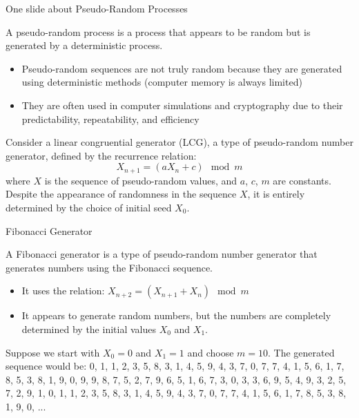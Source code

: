 \documentclass[fullscreen=true, bookmarks=true, hyperref={pdfencoding=unicode}]{beamer}
\begin{document}
\begin{frame}{One slide about Pseudo-Random Processes}

  \begin{definition}
  A pseudo-random process is a process that appears to be random 
  but is generated by a deterministic process.
  \end{definition}

  \begin{itemize}
      \pause\item Pseudo-random sequences are not truly random because 
      they are generated using deterministic methods (computer memory is always limited)
      \pause\item They are often used in computer simulations and cryptography 
      due to their predictability, repeatability, and efficiency
  \end{itemize}

  \pause
  \begin{example}
  \small
  Consider a linear congruential generator (LCG), a type of pseudo-random number generator, defined by the recurrence relation:
  \[
  X_{n+1} = (aX_n + c) \mod m
  \]
  where $X$ is the sequence of pseudo-random values, and $a$, $c$, $m$ are constants. Despite the appearance of randomness in the sequence $X$, it is entirely determined by the choice of initial seed $X_0$.
  \end{example}
\end{frame}


\begin{frame}{Fibonacci Generator}

  \pause
  \begin{definition}
  A Fibonacci generator is a type of pseudo-random number generator that generates numbers using the Fibonacci sequence.
  \end{definition}

  \pause
  \begin{itemize}
      \item It uses the relation: $X_{n+2} = (X_{n+1} + X_{n}) \mod m$
      \item It appears to generate random numbers, but the numbers are completely determined by the initial values $X_0$ and $X_1$.
  \end{itemize}

  \pause
  \begin{example}
    Suppose we start with $X_0 = 0$ and $X_1 = 1$ and choose $m = 10$. The generated sequence would be: 
    0, 1, 1, 2, 3, 5, 8, 3, 1, 4, 5, 9, 4, 3, 7, 0, 7, 7, 4, 1, 5, 6, 1, 7, 8, 
    5, 3, 8, 1, 9, 0, 9, 9, 8, 7, 5, 2, 7, 9, 6, 5, 1, 6, 7, 3, 0, 3, 3, 6, 9, 
    5, 4, 9, 3, 2, 5, 7, 2, 9, 1, 0, 1, 1, 2, 3, 5, 8, 3, 1, 4, 5, 9, 4, 3, 7, 
    0, 7, 7, 4, 1, 5, 6, 1, 7, 8, 5, 3, 8, 1, 9, 0, ...
  \end{example}
\end{frame}
\end{document}
